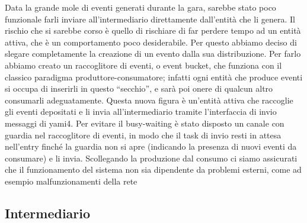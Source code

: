 Data la grande mole di eventi generati durante la gara, sarebbe stato poco funzionale farli inviare all’intermediario direttamente dall’entità che li genera. Il rischio che si sarebbe corso è quello di rischiare di far perdere tempo ad un entità attiva, che è un comportamento poco desiderabile. Per questo abbiamo deciso di slegare completamente la creazione di un evento dalla sua distribuzione. Per farlo abbiamo creato un raccoglitore di eventi, o event bucket, che funziona con il classico paradigma produttore-consumatore; infatti ogni entità che produce eventi si occupa di inserirli in questo “secchio”, e sarà poi onere di qualcun altro consumarli adeguatamente.
Questa nuova figura è un’entità attiva che raccoglie gli eventi depositati e li invia all’intermediario tramite l’interfaccia di invio messaggi di yami4. Per evitare il busy-waiting è stato disposto un canale con guardia nel raccoglitore di eventi, in modo che il task di invio resti in attesa nell’entry finché la guardia non si apre (indicando la presenza di nuovi eventi da consumare) e li invia.
Scollegando la produzione dal consumo ci siamo assicurati che il funzionamento del sistema non sia dipendente da problemi esterni, come ad esempio malfunzionamenti della rete

\subsection{Intermediario}

